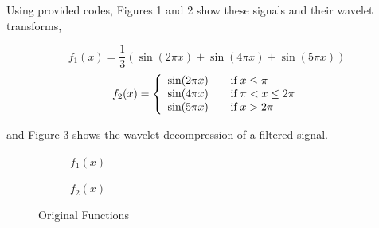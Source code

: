\documentclass[12pt]{article}
\begin{document}
Using provided codes, 
Figures 1 and 2 show these signals and their wavelet transforms, 

\[
f_1(x) = \frac{1}{3}(\sin(2\pi x) + \sin(4\pi x) + \sin(5\pi x))
\]
\[
f_2(x) = \left\{
  \begin{array}{l l}
    \sin(2\pi x) & \quad \textrm{if} \; x \le \pi \\
    \sin(4\pi x) & \quad \textrm{if} \; \pi < x \le 2\pi \\
    \sin(5\pi x) & \quad \textrm{if} \; x > 2\pi 
  \end{array} \right.\]

and Figure 3 shows the wavelet decompression of a filtered signal.



\begin{figure}
  \centering

  \begin{subfigure}[b]{0.85\textwidth}
    \caption{$f_1(x)$}
  \end{subfigure}
  \qquad
  \begin{subfigure}[b]{0.85\textwidth}
    \caption{$f_2(x)$}
  \end{subfigure}

  \caption{Original Functions}
  \label{orig}

\end{figure}
\end{document}
